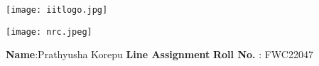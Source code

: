 \documentclass[10pt,a4paper]{report}
\begin{document}
\begin{figure*}[!tbp]
  \centering
  \begin{minipage}[b]{0.4\textwidth}
   \texttt{[image: iitlogo.jpg]} 
  \end{minipage}
  \hfill
  \vspace{5mm}\begin{minipage}[b]{0.4\textwidth}
\raggedleft \texttt{[image: nrc.jpeg]} 

  \end{minipage}\vspace{0.2cm}
\end{figure*}
\raggedright \textbf{Name}:\hspace{1mm}Prathyusha Korepu\hspace{3cm} \Large \textbf{Line Assignment}\hspace{2.5cm} %
\normalsize \textbf{Roll No.} :\hspace{1mm} FWC22047\vspace{1cm}
\end{document}
